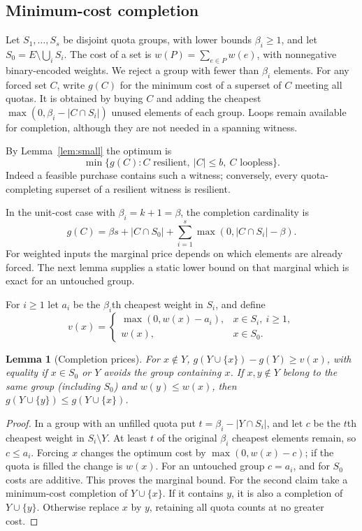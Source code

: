 \documentclass[11pt]{article}
\newtheorem{lemma}[theorem]{Lemma}
\theoremstyle{definition}
\theoremstyle{remark}\newtheorem{remark}[theorem]{Remark}
\begin{document}
\subsection{Minimum-cost completion}
Let $S_1,\ldots,S_s$ be disjoint quota groups, with lower
bounds $\beta_i\ge1$, and let $S_0=E\setminus\bigcup_iS_i$.
The cost of a set is $w(P)=\sum_{e\in P}w(e)$, with nonnegative
binary-encoded weights. We reject a group with fewer than
$\beta_i$ elements. For any forced set $C$, write $g(C)$ for
the minimum cost of a superset of $C$ meeting all quotas.
It is obtained by buying $C$ and adding the cheapest
$\max(0,\beta_i-|C\cap S_i|)$ unused elements of each group.
Loops remain available for completion, although they are not
needed in a spanning witness.

By Lemma~\ref{lem:small} the optimum is
\begin{equation}\label{eq:completion}
 \min\{g(C): C\text{ resilient},\ |C|\le b,\ C\text{ loopless}\}.
\end{equation}
Indeed a feasible purchase contains such a witness; conversely,
every quota-completing superset of a resilient witness is resilient.

In the unit-cost case with $\beta_i=k+1=\beta$, the completion
cardinality is
\[
 g(C)=\beta s+|C\cap S_0|+
      \sum_{i=1}^s\max(0,|C\cap S_i|-\beta).
\]
For weighted inputs the marginal price depends on which elements
are already forced. The next lemma supplies a static lower bound
on that marginal which is exact for an untouched group.

For $i\ge1$ let $a_i$ be the $\beta_i$th cheapest weight in $S_i$,
and define
\[
 v(x)=
 \begin{cases}
 \max(0,w(x)-a_i),& x\in S_i,\ i\ge1,\\
 w(x),&x\in S_0.
 \end{cases}
\]
\begin{lemma}[Completion prices]\label{lem:prices}
For $x\notin Y$,
$g(Y\cup\{x\})-g(Y)\ge v(x)$, with equality if $x\in S_0$ or
$Y$ avoids the group containing $x$.
If $x,y\notin Y$ belong to the same group (including $S_0$)
and $w(y)\le w(x)$, then
$g(Y\cup\{y\})\le g(Y\cup\{x\})$.
\end{lemma}
\begin{proof}
In a group with an unfilled quota put $t=\beta_i-|Y\cap S_i|$,
and let $c$ be the $t$th cheapest weight in $S_i\setminus Y$.
At least $t$ of the original $\beta_i$ cheapest elements remain,
so $c\le a_i$. Forcing $x$ changes the optimum cost by
$\max(0,w(x)-c)$; if the quota is filled the change is $w(x)$.
For an untouched group $c=a_i$, and for $S_0$ costs are additive.
This proves the marginal bound. For the second claim take a
minimum-cost completion of $Y\cup\{x\}$. If it contains $y$,
it is also a completion of $Y\cup\{y\}$. Otherwise replace $x$
by $y$, retaining all quota counts at no greater cost.
\end{proof}
\end{document}
